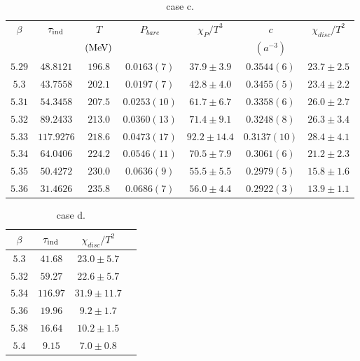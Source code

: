 \begin{table}
\begin{center}
\begin{tabular}{c|c|c|c|c|c|c}
    \hline    
 $\beta$ & $\tau_{\rm ind}$ & $T$ & $P_{bare}$ & $\chi _P/T^3$ & $c$ & $\chi_{disc}/T^2$ \\
  & & $(\rm MeV)$ & & & $(a^{-3})$ & \\
\hline
 $5.29$ & $48.8121$ & $196.8$ & $0.0163(7)$ & $37.9\pm 3.9$ & $0.3544(6)$ & $23.7\pm 2.5$ \\
\hline
 $5.3$ & $43.7558$ & $202.1$ & $0.0197(7)$ & $42.8\pm 4.0$ & $0.3455(5)$ & $23.4\pm 2.2$ \\
\hline
 $5.31$ & $54.3458$ & $207.5$ & $0.0253(10)$ & $61.7\pm 6.7$ & $0.3358(6)$ & $26.0\pm 2.7$ \\
\hline
 $5.32$ & $89.2433$ & $213.0$ & $0.0360(13)$ & $71.4\pm 9.1$ & $0.3248(8)$ & $26.3\pm 3.4$ \\
\hline
\textcolor[rgb]{1,0,0}{$5.33$} & $117.9276$ & $218.6$ & $0.0473(17)$ & \textcolor[rgb]{1,0,0}{$92.2\pm 14.4$} & $0.3137(10)$ & \textcolor[rgb]{1,0,0}{$28.4\pm 4.1$} \\
\hline
 $5.34$ & $64.0406$ & $224.2$ & $0.0546(11)$ & $70.5\pm 7.9$ & $0.3061(6)$ & $21.2\pm 2.3$ \\
\hline
 $5.35$ & $50.4272$ & $230.0$ & $0.0636(9)$ & $55.5\pm 5.5$ & $0.2979(5)$ & $15.8\pm 1.6$ \\
\hline
 $5.36$ & $31.4626$ & $235.8$ & $0.0686(7)$ & $56.0\pm 4.4$ & $0.2922(3)$ & $13.9\pm 1.1$ \\
\hline
\end{tabular}
\end{center}
\caption{\label{tab.res.staggeredam1res3}case c.}
\end{table}

\begin{table}
\begin{center}
\begin{tabular}{c|c|c|c}
    \hline    
$\beta$ & $\tau_{\rm ind}$ & $\chi_{disc}/T^2$ \\
\hline
$5.3$ & $41.68$ & $23.0\pm 5.7$\\
\hline
$5.32$ & $59.27$ & $22.6\pm 5.7$\\
\hline
\textcolor[rgb]{1,0,0}{$5.34$} & $116.97$ & \textcolor[rgb]{1,0,0}{$31.9\pm 11.7$}\\
\hline
$5.36$ & $19.96$ & $9.2\pm 1.7$\\
\hline
$5.38$ & $16.64$ & $10.2\pm 1.5$\\
\hline
$5.4$ & $9.15$ & $7.0\pm 0.8$ \\
\hline
\end{tabular}
\end{center}
\caption{\label{tab.res.staggeredam1res4}case d.}
\end{table}